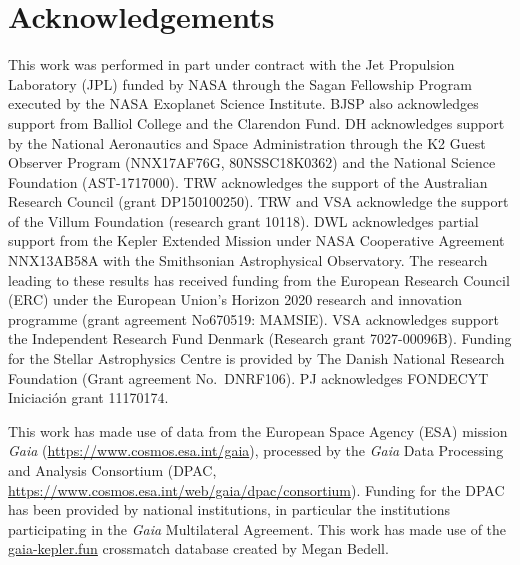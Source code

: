 \documentclass[a4paper,fleqn,usenatbib]{mnras}
\begin{document}
\section*{Acknowledgements} %

This work was performed in part under contract with the Jet Propulsion Laboratory (JPL) funded by NASA through the Sagan Fellowship Program executed by the NASA Exoplanet Science Institute. BJSP also acknowledges support from Balliol College and the Clarendon Fund. DH acknowledges support by the National Aeronautics and Space Administration through the K2 Guest Observer Program (NNX17AF76G, 80NSSC18K0362) and the National Science Foundation (AST-1717000). TRW acknowledges the support of the Australian Research Council (grant DP150100250). TRW and VSA acknowledge
the support of the Villum Foundation (research grant 10118). DWL acknowledges partial support from the Kepler Extended Mission under NASA Cooperative Agreement NNX13AB58A with the Smithsonian Astrophysical Observatory. The research leading to these results has received funding from the European Research Council (ERC) under the European Union's Horizon 2020 research and innovation programme (grant agreement No670519: MAMSIE). VSA acknowledges support the Independent Research Fund Denmark (Research grant 7027-00096B). Funding for the Stellar Astrophysics Centre is provided by The Danish National Research Foundation (Grant agreement No.~DNRF106). PJ acknowledges FONDECYT Iniciaci\'on grant 11170174. 


This work has made use of data from the European Space Agency (ESA) mission
{\it Gaia} (\url{https://www.cosmos.esa.int/gaia}), processed by the {\it Gaia}
Data Processing and Analysis Consortium (DPAC,
\url{https://www.cosmos.esa.int/web/gaia/dpac/consortium}). Funding for the DPAC
has been provided by national institutions, in particular the institutions
participating in the {\it Gaia} Multilateral Agreement. This work has made use of the \url{gaia-kepler.fun} crossmatch database created by Megan Bedell.
\end{document}
